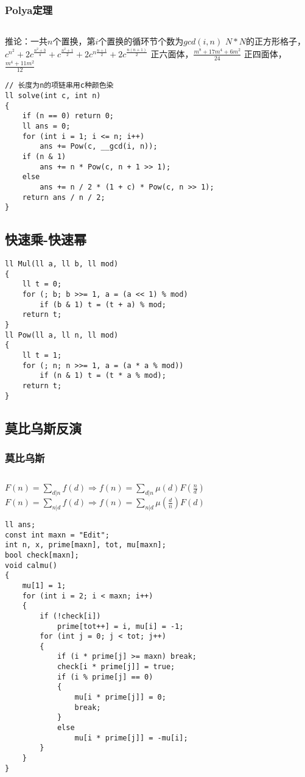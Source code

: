 \documentclass[a4]{article}
\begin{document}
\subsubsection{Polya定理}
\begin{lstlisting}
\end{lstlisting}
推论：一共$n$个置换，第$i$个置换的循环节个数为$gcd(i,n)$
$N*N$的正方形格子，$c^{n^2}+2c^{\frac{n^2+3}{4}}+c^{\frac{n^2+1}{2}}+2c^{n\frac{n+1}{2}}+2c^{\frac{n(n+1)}{2}}$
正六面体，$\frac{m^8+17m^4+6m^2}{24}$
正四面体，$\frac{m^4+11m^2}{12}$
\begin{lstlisting}
// 长度为n的项链串用c种颜色染
ll solve(int c, int n)
{
    if (n == 0) return 0;
    ll ans = 0;
    for (int i = 1; i <= n; i++)
        ans += Pow(c, __gcd(i, n));
    if (n & 1)
        ans += n * Pow(c, n + 1 >> 1);
    else
        ans += n / 2 * (1 + c) * Pow(c, n >> 1);
    return ans / n / 2;
}
\end{lstlisting}
\subsection{快速乘-快速幂}
\begin{lstlisting}
ll Mul(ll a, ll b, ll mod)
{
    ll t = 0;
    for (; b; b >>= 1, a = (a << 1) % mod)
        if (b & 1) t = (t + a) % mod;
    return t;
}
ll Pow(ll a, ll n, ll mod)
{
    ll t = 1;
    for (; n; n >>= 1, a = (a * a % mod))
        if (n & 1) t = (t * a % mod);
    return t;
}
\end{lstlisting}
\subsection{莫比乌斯反演}
\subsubsection{莫比乌斯}
\begin{lstlisting}
\end{lstlisting}
$F(n)=\sum_{d|n}f(d)\Rightarrow f(n)=\sum_{d|n}\mu(d)F(\frac{n}{d})$
$F(n)=\sum_{n|d}f(d)\Rightarrow f(n)=\sum_{n|d}\mu(\frac{d}{n})F(d)$
\begin{lstlisting}
ll ans;
const int maxn = "Edit";
int n, x, prime[maxn], tot, mu[maxn];
bool check[maxn];
void calmu()
{
    mu[1] = 1;
    for (int i = 2; i < maxn; i++)
    {
        if (!check[i])
            prime[tot++] = i, mu[i] = -1;
        for (int j = 0; j < tot; j++)
        {
            if (i * prime[j] >= maxn) break;
            check[i * prime[j]] = true;
            if (i % prime[j] == 0)
            {
                mu[i * prime[j]] = 0;
                break;
            }
            else
                mu[i * prime[j]] = -mu[i];
        }
    }
}
\end{lstlisting}
\end{document}
